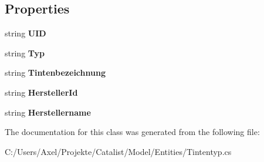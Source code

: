 \subsection*{Properties}
\begin{DoxyCompactItemize}
\item 
string {\bfseries U\+ID}\hypertarget{class_products_1_1_model_1_1_entities_1_1_tintentyp_a23702a53c4bf626834c6582a07cf431e}{}\label{class_products_1_1_model_1_1_entities_1_1_tintentyp_a23702a53c4bf626834c6582a07cf431e}

\item 
string {\bfseries Typ}\hypertarget{class_products_1_1_model_1_1_entities_1_1_tintentyp_a704cfe987e6d38e0d06d3cccffd518dd}{}\label{class_products_1_1_model_1_1_entities_1_1_tintentyp_a704cfe987e6d38e0d06d3cccffd518dd}

\item 
string {\bfseries Tintenbezeichnung}\hypertarget{class_products_1_1_model_1_1_entities_1_1_tintentyp_adfbe8e5da8a5b7bda5f829de5858d603}{}\label{class_products_1_1_model_1_1_entities_1_1_tintentyp_adfbe8e5da8a5b7bda5f829de5858d603}

\item 
string {\bfseries Hersteller\+Id}\hypertarget{class_products_1_1_model_1_1_entities_1_1_tintentyp_a0195cbdccc86b697ba3cd462f18e06b9}{}\label{class_products_1_1_model_1_1_entities_1_1_tintentyp_a0195cbdccc86b697ba3cd462f18e06b9}

\item 
string {\bfseries Herstellername}\hypertarget{class_products_1_1_model_1_1_entities_1_1_tintentyp_abcfbd6d7092e64d64ed63e52bbec5920}{}\label{class_products_1_1_model_1_1_entities_1_1_tintentyp_abcfbd6d7092e64d64ed63e52bbec5920}

\end{DoxyCompactItemize}


The documentation for this class was generated from the following file\+:\begin{DoxyCompactItemize}
\item 
C\+:/\+Users/\+Axel/\+Projekte/\+Catalist/\+Model/\+Entities/Tintentyp.\+cs\end{DoxyCompactItemize}

